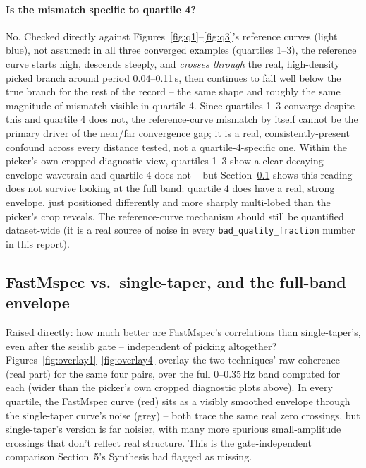 \documentclass[11pt]{article}
\begin{document}
\paragraph{Is the mismatch specific to quartile 4?} No. Checked directly against
Figures~\ref{fig:q1}--\ref{fig:q3}'s reference curves (light blue), not assumed: in all three
converged examples (quartiles 1--3), the reference curve starts high, descends steeply, and
\emph{crosses through} the real, high-density picked branch around period 0.04--0.11\,s, then
continues to fall well below the true branch for the rest of the record -- the same shape and
roughly the same magnitude of mismatch visible in quartile 4. Since quartiles 1--3 converge
despite this and quartile 4 does not, the reference-curve mismatch by itself cannot be the primary
driver of the near/far convergence gap; it is a real, consistently-present confound across every
distance tested, not a quartile-4-specific one. Within the picker's own cropped diagnostic view,
quartiles 1--3 show a clear decaying-envelope wavetrain and quartile 4 does not -- but
Section~\ref{sec:overlay} shows this reading does not survive looking at the full band: quartile 4
does have a real, strong envelope, just positioned differently and more sharply multi-lobed than
the picker's crop reveals. The reference-curve mechanism should still be quantified dataset-wide
(it is a real source of noise in every \texttt{bad\_quality\_fraction} number in this report).

\subsection{FastMspec vs.\ single-taper, and the full-band envelope}
\label{sec:overlay}

Raised directly: how much better are FastMspec's correlations than single-taper's, even after the
seislib gate -- independent of picking altogether? Figures~\ref{fig:overlay1}--\ref{fig:overlay4}
overlay the two techniques' raw coherence (real part) for the same four pairs, over the full
0--0.35\,Hz band computed for each (wider than the picker's own cropped diagnostic plots above). In
every quartile, the FastMspec curve (red) sits as a visibly smoothed envelope through the
single-taper curve's noise (grey) -- both trace the same real zero crossings, but single-taper's
version is far noisier, with many more spurious small-amplitude crossings that don't reflect real
structure. This is the gate-independent comparison Section~5's Synthesis had flagged as missing.
\end{document}
